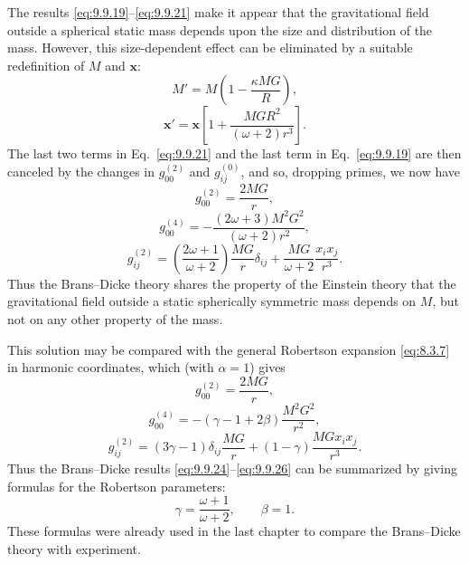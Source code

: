 The results \eqref{eq:9.9.19}--\eqref{eq:9.9.21} make it appear that the
gravitational field outside a spherical static mass depends upon the size
and distribution of the mass. However, this size-dependent effect can be
eliminated by a suitable redefinition of \(M\) and \(\mathbf x\):
\begin{equation}
  M'
  =
  M\left(1-\frac{\kappa MG}{R}\right),
  \tag{9.9.22}\label{eq:9.9.22}
\end{equation}
\begin{equation}
  \mathbf x'
  =
  \mathbf x\left[
    1+\frac{MGR^2}{(\omega+2)r^3}
  \right].
  \tag{9.9.23}\label{eq:9.9.23}
\end{equation}
The last two terms in Eq.~\eqref{eq:9.9.21} and the last term in
Eq.~\eqref{eq:9.9.19} are then canceled by the changes in
\(g_{00}^{(2)}\) and \(g_{ij}^{(0)}\), and so, dropping primes, we now have
\begin{equation}
  g_{00}^{(2)}=\frac{2MG}{r},
  \tag{9.9.24}\label{eq:9.9.24}
\end{equation}
\begin{equation}
  g_{00}^{(4)}
  =
  -\frac{(2\omega+3)M^2G^2}{(\omega+2)r^2},
  \tag{9.9.25}\label{eq:9.9.25}
\end{equation}
\begin{equation}
  g_{ij}^{(2)}
  =
  \left(\frac{2\omega+1}{\omega+2}\right)
  \frac{MG}{r}\delta_{ij}
  +\frac{MG}{\omega+2}\frac{x_ix_j}{r^3}.
  \tag{9.9.26}\label{eq:9.9.26}
\end{equation}
Thus the Brans--Dicke theory shares the property of the Einstein theory
that the gravitational field outside a static spherically symmetric mass
depends on \(M\), but not on any other property of the mass.

This solution may be compared with the general Robertson expansion
\eqref{eq:8.3.7} in harmonic coordinates, which (with \(\alpha=1\)) gives
\[
  g_{00}^{(2)}=\frac{2MG}{r},
\]
\[
  g_{00}^{(4)}
  =
  -(\gamma-1+2\beta)\frac{M^2G^2}{r^2},
\]
\[
  g_{ij}^{(2)}
  =
  (3\gamma-1)\delta_{ij}\frac{MG}{r}
  +(1-\gamma)\frac{MGx_ix_j}{r^3}.
\]
Thus the Brans--Dicke results
\eqref{eq:9.9.24}--\eqref{eq:9.9.26} can be summarized by giving formulas
for the Robertson parameters:
\begin{equation}
  \gamma=\frac{\omega+1}{\omega+2},
  \qquad
  \beta=1.
  \tag{9.9.27}\label{eq:9.9.27}
\end{equation}
These formulas were already used in the last chapter to compare the
Brans--Dicke theory with experiment.

